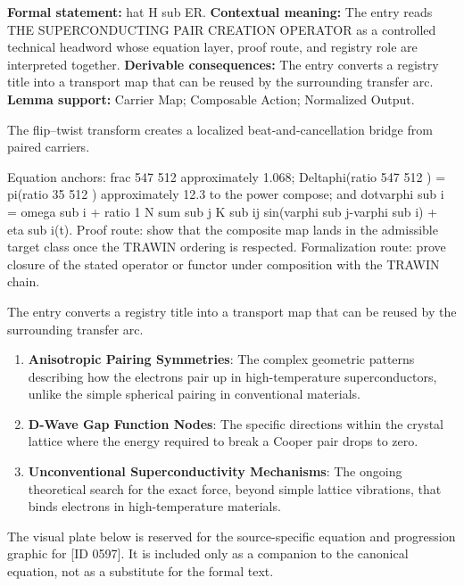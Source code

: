 \begingroup\footnotesize\setlength{\emergencystretch}{3em}\sloppy
\textbf{Formal statement:} hat H sub ER. \textbf{Contextual meaning:} The entry reads THE SUPERCONDUCTING PAIR CREATION OPERATOR as a controlled technical headword whose equation layer, proof route, and registry role are interpreted together. \textbf{Derivable consequences:} The entry converts a registry title into a transport map that can be reused by the surrounding transfer arc. \textbf{Lemma support:} Carrier Map; Composable Action; Normalized Output.\par
\endgroup

The flip--twist transform creates a localized beat-and-cancellation bridge from paired carriers.

Equation anchors: frac 547 512 approximately 1.068; Deltaphi(ratio 547 512 ) = pi(ratio 35 512 ) approximately 12.3 to the power compose; and dotvarphi sub i = omega sub i + ratio 1 N sum sub j K sub ij sin(varphi sub j-varphi sub i) + eta sub i(t). Proof route: show that the composite map lands in the admissible target class once the TRAWIN ordering is respected. Formalization route: prove closure of the stated operator or functor under composition with the TRAWIN chain.

The entry converts a registry title into a transport map that can be reused by the surrounding transfer arc.
\endgroup

\begin{enumerate}[leftmargin=1.6em,itemsep=6pt,topsep=4pt]
\item \textbf{Anisotropic Pairing Symmetries}: The complex geometric patterns describing how the electrons pair up in high-temperature superconductors, unlike the simple spherical pairing in conventional materials.
\item \textbf{D-Wave Gap Function Nodes}: The specific directions within the crystal lattice where the energy required to break a Cooper pair drops to zero.
\item \textbf{Unconventional Superconductivity Mechanisms}: The ongoing theoretical search for the exact force, beyond simple lattice vibrations, that binds electrons in high-temperature materials.
\end{enumerate}

\begingroup\footnotesize\sloppy
The visual plate below is reserved for the source-specific equation and progression graphic for [ID 0597]. It is included only as a companion to the canonical equation, not as a substitute for the formal text.
\par\endgroup
\ifTZPDarkEdition
{}
\fi

